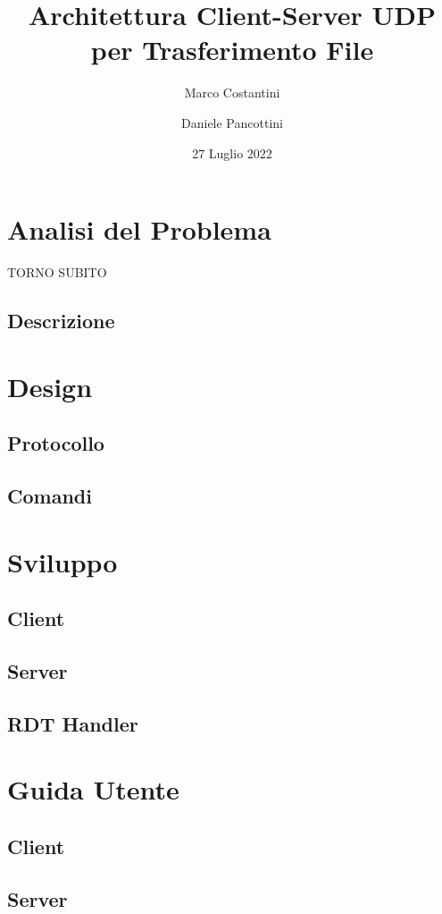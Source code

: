 \documentclass{article}
\title{Architettura Client-Server UDP per Trasferimento File}
\author{Marco Costantini \and Daniele Pancottini}
\date{27 Luglio 2022}
\begin{document}
\maketitle
\newpage

\tableofcontents

\newpage
\section{Analisi del Problema}
TORNO SUBITO
\subsection{Descrizione}

\newpage
\section{Design}
\subsection{Protocollo}
\subsection{Comandi}

\newpage
\section{Sviluppo}
\subsection{Client}
\subsection{Server}
\subsection{RDT Handler}

\newpage
\section{Guida Utente}
\subsection{Client}
\subsection{Server}

\end{document}
